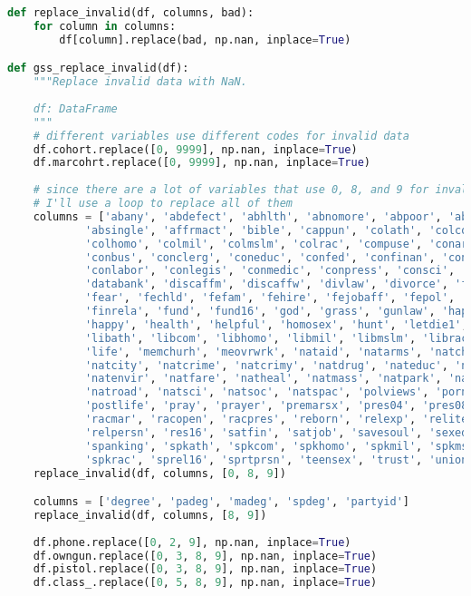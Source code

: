 \begin{lstlisting}[language=Python]
def replace_invalid(df, columns, bad):
    for column in columns:
        df[column].replace(bad, np.nan, inplace=True)

def gss_replace_invalid(df):
    """Replace invalid data with NaN.
    
    df: DataFrame
    """
    # different variables use different codes for invalid data
    df.cohort.replace([0, 9999], np.nan, inplace=True)
    df.marcohrt.replace([0, 9999], np.nan, inplace=True)
        
    # since there are a lot of variables that use 0, 8, and 9 for invalid data,
    # I'll use a loop to replace all of them
    columns = ['abany', 'abdefect', 'abhlth', 'abnomore', 'abpoor', 'abrape', 
            'absingle', 'affrmact', 'bible', 'cappun', 'colath', 'colcom', 
            'colhomo', 'colmil', 'colmslm', 'colrac', 'compuse', 'conarmy', 
            'conbus', 'conclerg', 'coneduc', 'confed', 'confinan', 'conjudge', 
            'conlabor', 'conlegis', 'conmedic', 'conpress', 'consci', 'contv', 
            'databank', 'discaffm', 'discaffw', 'divlaw', 'divorce', 'fair', 
            'fear', 'fechld', 'fefam', 'fehire', 'fejobaff', 'fepol', 'fepresch', 
            'finrela', 'fund', 'fund16', 'god', 'grass', 'gunlaw', 'hapmar', 
            'happy', 'health', 'helpful', 'homosex', 'hunt', 'letdie1', 
            'libath', 'libcom', 'libhomo', 'libmil', 'libmslm', 'librac', 
            'life', 'memchurh', 'meovrwrk', 'nataid', 'natarms', 'natchld', 
            'natcity', 'natcrime', 'natcrimy', 'natdrug', 'nateduc', 'natenrgy', 
            'natenvir', 'natfare', 'natheal', 'natmass', 'natpark', 'natrace', 
            'natroad', 'natsci', 'natsoc', 'natspac', 'polviews', 'pornlaw', 
            'postlife', 'pray', 'prayer', 'premarsx', 'pres04', 'pres08', 'pres12', 
            'racmar', 'racopen', 'racpres', 'reborn', 'relexp', 'reliten', 
            'relpersn', 'res16', 'satfin', 'satjob', 'savesoul', 'sexeduc', 
            'spanking', 'spkath', 'spkcom', 'spkhomo', 'spkmil', 'spkmslm', 
            'spkrac', 'sprel16', 'sprtprsn', 'teensex', 'trust', 'union_', 'xmarsex']
    replace_invalid(df, columns, [0, 8, 9])

    columns = ['degree', 'padeg', 'madeg', 'spdeg', 'partyid']
    replace_invalid(df, columns, [8, 9])
        
    df.phone.replace([0, 2, 9], np.nan, inplace=True)
    df.owngun.replace([0, 3, 8, 9], np.nan, inplace=True)
    df.pistol.replace([0, 3, 8, 9], np.nan, inplace=True)
    df.class_.replace([0, 5, 8, 9], np.nan, inplace=True)
    

\end{lstlisting}
